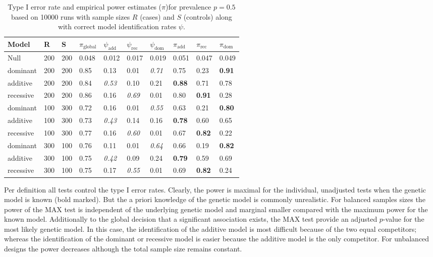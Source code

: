 \documentclass[bimj,fleqn]{w-art}
\begin{document}
\begin{table}
\begin{center}
\caption{Type I error rate and empirical power estimates ($\pi$)for prevalence $p=0.5$ based on 10000 runs
         with sample sizes $R$ (cases) and $S$ (controls) along with correct model identification rates
         $\psi$. \label{simtab}}
\vspace*{0.5cm}
  \begin{tabular}{l l l l| l l l |l l l}
        Model & R & S & $\pi_{\text{global}}$ &  $\psi_\text{add}$ & $\psi_\text{rec}$ & $\psi_\text{dom}$ & $\pi_\text{add}$ & $\pi_\text{rec}$ & $\pi_\text{dom}$   \\
 \hline
 Null & 200 & 200 & 0.048&  0.012 & 0.017&  0.019           &   0.051 & 0.047 & 0.049 \\
 dominant  & 200 & 200 & 0.85 &  0.13 &  0.01 &  \textit{0.71} & 0.75 &  0.23 &  \textbf{0.91} \\
 additive  & 200 & 200 & 0.84 &  \textit{0.53} & 0.10  & 0.21 &  \textbf{0.88} & 0.71 &  0.78 \\
 recessive  & 200 & 200 & 0.86 &  0.16 &  \textit{0.69} & 0.01 &  0.80 &  \textbf{0.91} & 0.28 \\
 dominant  & 100 & 300 & 0.72 &  0.16 &  0.01 &  \textit{0.55}&  0.63 &  0.21 & \textbf{0.80} \\
 additive  & 100 & 300 & 0.73 &  \textit{0.43} & 0.14 &  0.16 &  \textbf{0.78} & 0.60 &  0.65 \\
 recessive  & 100 & 300 & 0.77 &  0.16 &  \textit{0.60} & 0.01 &  0.67 &  \textbf{0.82} & 0.22  \\
 dominant  & 300 & 100 & 0.76 &  0.11 &  0.01 &  \textit{0.64} & 0.66 &  0.19 &  \textbf{0.82} \\
 additive  & 300 & 100 & 0.75 &  \textit{0.42} & 0.09 &  0.24 &  \textbf{0.79} & 0.59 &  0.69 \\
 recessive  & 300 & 100 & 0.75 &  0.17 &  \textit{0.55} & 0.01 &  0.69 &  \textbf{0.82 }& 0.24 \\
\hline
 \end{tabular}
\end{center}
 \end{table} 

 
Per definition all tests control the type I error rates. Clearly, the power is maximal for 
the individual, unadjusted tests when the genetic model is known (bold marked). But the a 
priori knowledge of the genetic model is commonly unrealistic. For balanced samples sizes the power 
of the MAX test is independent of the underlying genetic model and marginal smaller 
compared with the maximum power for the known model. Additionally to the global decision 
that a significant association exists, the MAX test provide an adjusted $p$-value for the 
most likely genetic model. In this case, the identification of the additive model is most difficult 
because of the two equal competitors; whereas the identification of the dominant or recessive 
model is easier because the additive model is the only competitor. For unbalanced 
designs the power decreases although the total sample size remains constant.
\end{document}
